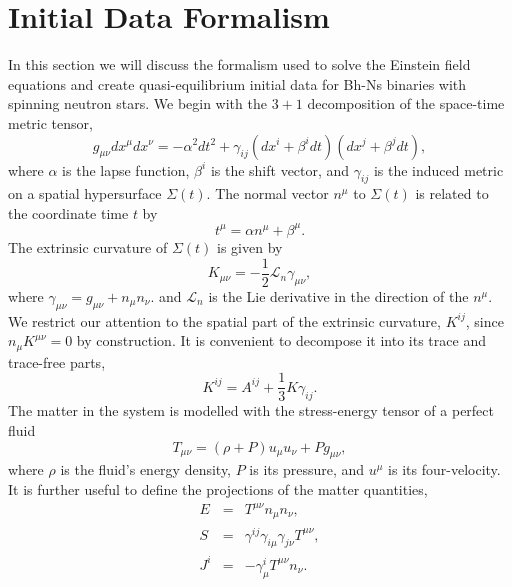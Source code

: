 \section{Initial Data Formalism}
\label{sec:Bh-NSIDF}
In this section we will discuss the formalism used to solve the
Einstein field equations and create quasi-equilibrium initial data for
Bh-Ns binaries with spinning neutron
stars. We begin with the $3+1$ decomposition of the space-time metric
tensor,
\begin{equation}
g_{\mu\nu}dx^{\mu}dx^{\nu} = -\alpha^2dt^2 + \gamma_{ij}\left(dx^i +
  \beta^idt\right)\left(dx^j+\beta^jdt\right),
\end{equation}
where $\alpha$ is the lapse function, $\beta^i$ is the shift vector,
and $\gamma_{ij}$ is the induced metric on a spatial hypersurface
$\Sigma(t)$. The normal vector $n^{\mu}$ to $\Sigma(t)$ is related to
the coordinate time $t$ by
\begin{equation}
t^{\mu} = \alpha n^{\mu} + \beta^{\mu}.
\end{equation}
The extrinsic curvature of $\Sigma(t)$ is given by
\begin{equation}
K_{\mu\nu} = -\frac{1}{2}\mathcal{L}_n\gamma_{\mu\nu},
\end{equation}
where $\gamma_{\mu\nu}=g_{\mu\nu}+n_{\mu}n_{\nu}.$ and $\mathcal{L}_n$
is the Lie derivative in the direction of the $n^{\mu}$. We restrict our
attention to the spatial part of the extrinsic curvature, $K^{ij}$,
since $n_{\mu}K^{\mu\nu}=0$ by construction. It is convenient to
decompose it into its trace and trace-free parts,
\begin{equation}
K^{ij} = A^{ij}+\frac{1}{3}K\gamma_{ij}.
\end{equation}
The matter in the system is modelled with the stress-energy tensor of
a perfect fluid 
\begin{equation}
T_{\mu\nu}=\left(\rho+P\right)u_{\mu}u_{\nu}+Pg_{\mu\nu},
\end{equation}
where $\rho$ is the fluid's energy density, $P$ is its pressure, and
$u^{\mu}$ is its four-velocity. It is further useful to define the
projections of the matter quantities,
\begin{eqnarray}
E &=& T^{\mu\nu}n_{\mu}n_{\nu},\\
S &=& \gamma^{ij}\gamma_{i\mu}\gamma_{j\nu}T^{\mu\nu}, \\
J^i &=& -\gamma^{i}_{\mu}T^{\mu\nu}n_{\nu}.
\end{eqnarray}
